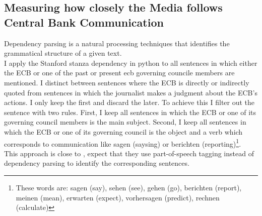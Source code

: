 \documentclass[review]{elsarticle}
\begin{document}
\subsection{Measuring how closely the Media follows Central Bank Communication}

Dependency parsing is a natural processing techniques that identifies the grammatical structure of a given text. 
\\
I apply the Stanford stanza dependency in python to all sentences in which either the ECB or one of the past or present ecb governing councile members are mentioned. I distinct between sentences where the ECB is directly or indirectly quoted from sentences in which the journalist makes a judgment about the ECB's actions. I only keep the first and discard the later. To achieve this I filter out the sentence with two rules. First, I keep all sentences in which the ECB or one of its governing council members is the main subject. Second, I keep all sentences in which the ECB or one of its governing council is the object and a verb which corresponds to communication like sagen (saysing) or berichten (reporting)\footnote{These words are: sagen (say), sehen (see), gehen (go), berichten (report), meinen (mean), erwarten (expect), vorhersagen (predict), rechnen (calculate)}.
\\
This approach is close to \cite{Picaultetal2022}, expect that they use part-of-speech tagging instead of dependency parsing to identify the corresponding sentences.
\end{document}
